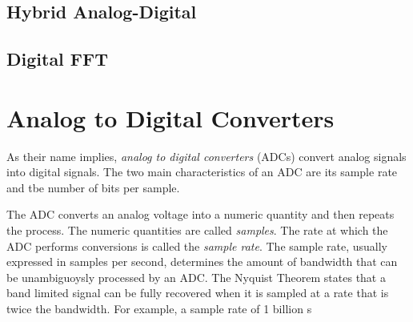 \documentclass{article}
\begin{document}
\subsection{Hybrid Analog-Digital}\label{hybrid-analog-digital}

\subsection{Digital FFT}\label{digital-fft}

\section{Analog to Digital
Converters}\label{analog-to-digital-converters}

As their name implies, \emph{analog to digital converters} (ADCs)
convert analog signals into digital signals. The two main
characteristics of an ADC are its sample rate and tbe number of bits per
sample.

The ADC converts an analog voltage into a numeric quantity and then
repeats the process. The numeric quantities are called \emph{samples}.
The rate at which the ADC performs conversions is called the
\emph{sample rate}. The sample rate, usually expressed in samples per
second, determines the amount of bandwidth that can be unambiguoysly
processed by an ADC. The Nyquist Theorem states that a band limited
signal can be fully recovered when it is sampled at a rate that is twice
the bandwidth. For example, a sample rate of 1 billion s
\end{document}
